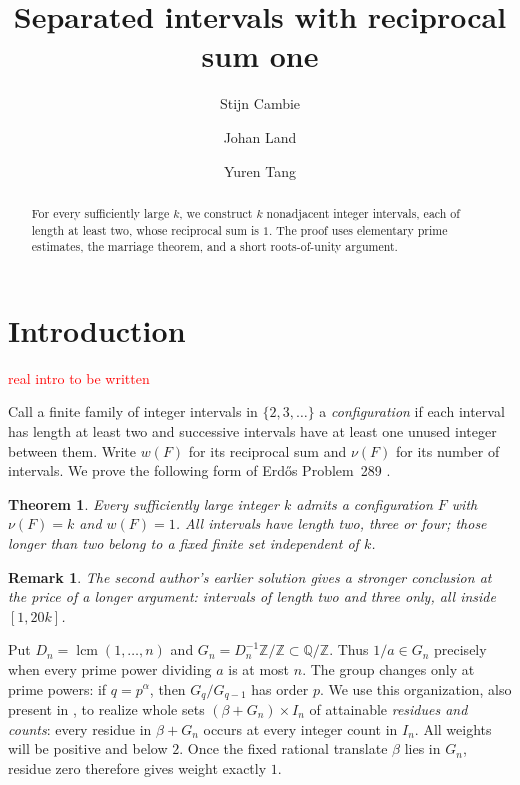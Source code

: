 \documentclass[11pt]{article}
\title{Separated intervals with reciprocal sum one}
\author{Stijn Cambie \and Johan Land \and Yuren Tang}\date{}
\makeatletter
\newtheorem{theorem}{Theorem}
\newtheorem{remark}{Remark}
\newcommand{\Z}{\mathbb Z}
\newcommand{\Q}{\mathbb Q}
\DeclareMathOperator{\lcm}{lcm}
\renewcommand{\maketitle}{%
 \begin{center}{\LARGE\@title\par}\end{center}\vspace{.35\baselineskip}}
\makeatother
\begin{document}
\maketitle
\begin{abstract}
For every sufficiently large \(k\), we construct \(k\) nonadjacent
integer intervals, each of length at least two, whose reciprocal sum
is \(1\). The proof uses elementary prime estimates, the marriage
theorem, and a short roots-of-unity argument. 
\end{abstract}


\section{Introduction}


\textcolor{red}{real intro to be written}

Call a finite family of integer intervals in \(\{2,3,\ldots\}\)
a \emph{configuration} if each interval has length at least two
and successive intervals have at least one unused integer between them.
Write \(w(F)\) for its reciprocal sum and \(\nu(F)\) for its number of
intervals. We prove the following form of Erd\H{o}s Problem~289
\cite{EG}.

\begin{theorem}\label{main}
Every sufficiently large integer \(k\) admits a configuration \(F\)
with \(\nu(F)=k\) and \(w(F)=1\).
All intervals have length two, three or four; those longer than two
belong to a fixed finite set independent of \(k\).
\end{theorem}

\begin{remark}\label{stronger}
The second author's earlier solution \cite{Land} gives a stronger conclusion
at the price of a longer argument: intervals of length two and three only,
all inside $[1,20k]$.
\end{remark}

Put \(D_n=\lcm(1,\ldots,n)\) and
\(G_n=D_n^{-1}\Z/\Z\subset\Q/\Z\).
Thus \(1/a\in G_n\) precisely when every prime power dividing \(a\)
is at most \(n\). The group changes only at prime powers:
if \(q=p^\alpha\), then \(G_q/G_{q-1}\) has order \(p\).
We use this organization, also present in \cite{Land,Tang}, to
realize whole sets \((\beta+G_n)\times I_n\) of attainable
\emph{residues and counts}: every residue in \(\beta+G_n\)
occurs at every integer count in \(I_n\).
All weights will be positive and below \(2\).
Once the fixed rational translate \(\beta\) lies in \(G_n\),
residue zero therefore gives weight exactly \(1\).
\end{document}
